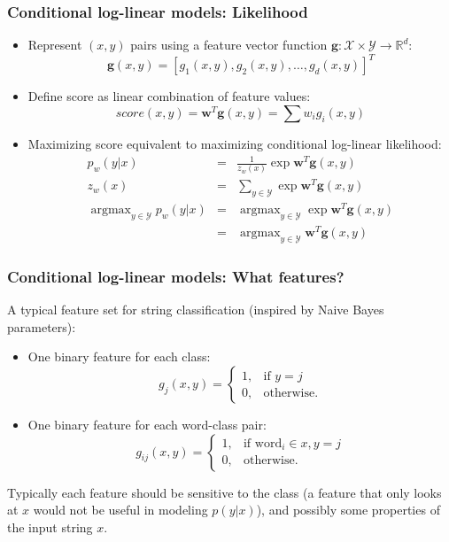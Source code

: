 \documentclass[ignorenonframetext,plain]{beamer}
\DeclareMathOperator*{\argmax}{argmax}
\newcommand{\score}{\mathit{score}}
\renewcommand{\vec}{\mathbf}
\begin{document}
\begin{frame}\frametitle{Conditional log-linear models: Likelihood}
\begin{itemize}
\item Represent $(x, y)$ pairs using a feature vector function
  $\vec{g}: \mathcal{X} \times \mathcal{Y} \rightarrow
  \mathbb{R}^d:$ \[
\vec{g}(x, y) = [ g_1(x, y), g_2(x, y), \dots, g_d(x, y) ]^T
\]
\item Define score as linear combination of feature values: \[
  \score(x, y) = \vec{w}^T \vec{g}(x, y) = \sum w_i g_i(x, y)
\]
\item Maximizing score equivalent to maximizing conditional log-linear
  likelihood:
\begin{eqnarray*}
  p_w(y|x) &=& \frac{1}{z_w(x)}\exp \vec{w}^T \vec{g}(x, y) \\
  z_w(x) &=& \sum_{y\in\mathcal{Y}} \exp \vec{w}^T \vec{g}(x, y) \\
  \argmax_{y\in\mathcal{Y}} p_w(y|x)
    &=& \argmax_{y\in\mathcal{Y}} \exp \vec{w}^T \vec{g}(x, y) \\
    &=& \argmax_{y\in\mathcal{Y}} \vec{w}^T \vec{g}(x, y)
\end{eqnarray*}
\end{itemize}
\end{frame}

\begin{frame}\frametitle{Conditional log-linear models: What features?}
A typical feature set for string classification (inspired by Naive
Bayes parameters):\begin{itemize}
\item One binary feature for each class:\[
g_j(x, y) = 
\begin{cases}
1,& \text{if } y=j \\
0,& \text{otherwise.}
\end{cases}
\]
\item One binary feature for each word-class pair:\[
g_{ij}(x, y) = 
\begin{cases}
1,& \text{if word}_i\in x, y=j \\
0,& \text{otherwise.}
\end{cases}
\]
\end{itemize}
Typically each feature should be sensitive to the class (a feature
that only looks at $x$ would not be useful in modeling $p(y|x)$), and
possibly some properties of the input string $x$.
\end{frame}
\end{document}
